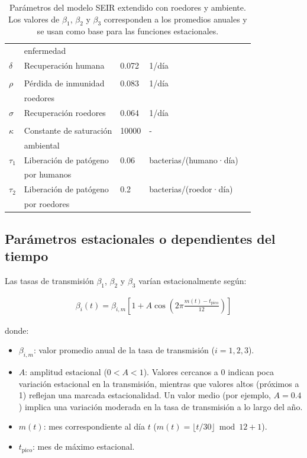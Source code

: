 \documentclass[12pt,a4paper]{article}
\begin{document}
\begin{table}[H]
\begin{tabular}{@{}lllll@{}}
         & enfermedad  &  &  &  \\
$\delta$ & Recuperación humana 
         & 0.072 & 1/día & \cite{engida2022} \\
         &  &  &  &  \\
$\rho$ & Pérdida de inmunidad
       & 0.083 & 1/día & \cite{engida2022} \\
       &  roedores  &  &  &  \\
$\sigma$ & Recuperación roedores 
         & 0.064 & 1/día & \cite{engida2022} \\
         &  &  &  &  \\
$\kappa$ & Constante de saturación
         & 10000 & - & \cite{engida2022} \\
         &  ambiental  &  &  &  \\
$\tau_1$ & Liberación de patógeno 
         & 0.06 & bacterias/(humano·día) & \cite{minter2019} \\
         &  por humanos &  &  &  \\
$\tau_2$ & Liberación de patógeno 
         & 0.2 & bacterias/(roedor·día) & \cite{minter2019} \\
         & por roedores  &  &  &  \\
\bottomrule
\end{tabular}
\caption{Parámetros del modelo SEIR extendido con roedores y ambiente. Los valores de $\beta_1$, $\beta_2$ y $\beta_3$ corresponden a los promedios anuales y se usan como base para las funciones estacionales.}
\end{table}



\subsection{Parámetros estacionales o dependientes del tiempo}
Las tasas de transmisión $\beta_1$, $\beta_2$ y $\beta_3$ varían estacionalmente según:

\begin{align*}
\beta_i(t) = \beta_{i,m} \left[1 + A \cos\left(2\pi \frac{m(t) - t_{\text{pico}}}{12}\right)\right]
\end{align*}

donde:
\begin{itemize}
    \item $\beta_{i,m}$: valor promedio anual de la tasa de transmisión ($i=1,2,3$).
    \item $A$: amplitud estacional ($0 < A < 1$). Valores cercanos a 0 indican poca variación estacional en la transmisión, mientras que valores altos (próximos a 1) reflejan una marcada estacionalidad. Un valor medio (por ejemplo, $A=0.4$) implica una variación moderada en la tasa de transmisión a lo largo del año.
    \item $m(t)$: mes correspondiente al día $t$ ($m(t) = \lfloor t/30 \rfloor \bmod 12 + 1$).
    \item $t_{\text{pico}}$: mes de máximo estacional.
\end{itemize}
\end{document}
